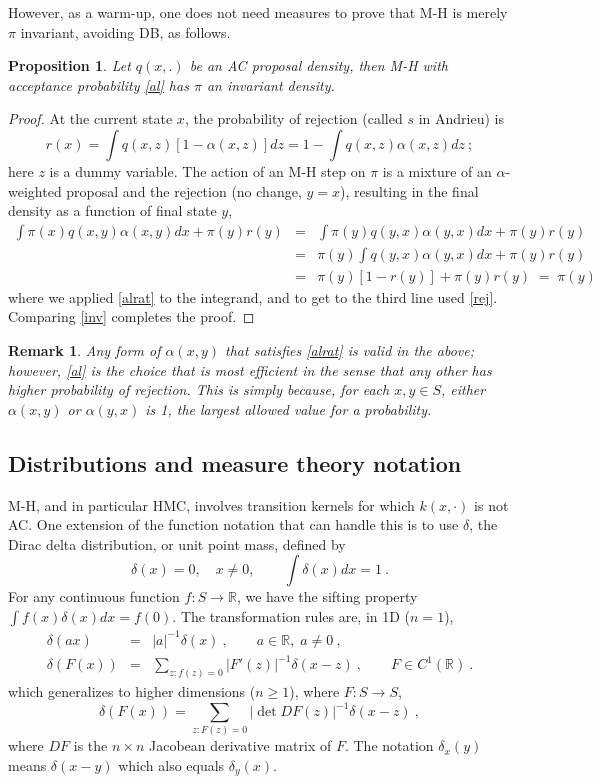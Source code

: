 \documentclass[10pt]{article}
\newcommand{\be}{\begin{equation}}
\newcommand{\ee}{\end{equation}}
\newcommand{\bea}{\begin{eqnarray}}
\newcommand{\eea}{\end{eqnarray}}
\newcommand{\R}{\mathbb{R}}
\newtheorem{pro}[thm]{Proposition}
\newtheorem{rmk}[thm]{Remark}
\newcommand{\al}{\alpha}
\begin{document}
However, as a warm-up, one does not need measures to prove that M-H is merely
$\pi$ invariant, avoiding DB, as follows.
\begin{pro}
  Let $q(x,.)$ be an AC proposal density, then M-H with acceptance probability
  \eqref{al} has $\pi$ an invariant density.
  \label{p:mhinv}
\end{pro}
\begin{proof}
  At the current state $x$, the probability of rejection
  (called $s$ in Andrieu) is
  \be
  r(x) = \int q(x,z) [1-\al(x,z)] dz  = 1 - \int q(x,z) \al(x,z) dz~;
  \label{rej}
  \ee
  here $z$ is a dummy variable.
  The action of an M-H step on $\pi$ is a mixture of an $\al$-weighted proposal
  and the rejection (no change, $y=x$),
  resulting in the final density as a function of final state $y$,
  \bea
  \int \pi(x) q(x,y)\al(x,y) dx + \pi(y) r(y)
  &=& \int \pi(y) q(y,x)\al(y,x) dx + \pi(y) r(y)
  \nonumber \\
  &=& \pi(y) \int q(y,x)\al(y,x) dx + \pi(y) r(y)
  \nonumber \\
  &=& \pi(y) [1-r(y)] + \pi(y) r(y) \; = \; \pi(y)
  \nonumber
\eea
where we applied \eqref{alrat} to the integrand,
and to get to the third line used \eqref{rej}.
Comparing \eqref{inv} completes the proof.
\end{proof}

\begin{rmk}
Any form of $\al(x,y)$ that satisfies \eqref{alrat} is valid
in the above; however, \eqref{al} is the choice that is most efficient
in the sense that any other has higher probability of rejection.
This is simply because, for each $x,y\in S$,
either $\al(x,y)$ or $\al(y,x)$ is 1, the largest
allowed value for a probability.
\end{rmk}


\subsection{Distributions and measure theory notation}

M-H, and in particular HMC,
involves transition kernels for which $k(x,\cdot)$
is not AC.
One extension of the function notation that can handle
this is to use $\delta$, the Dirac delta distribution, or unit point mass, defined by
$$
\delta(x) = 0, \quad x\neq 0, \qquad \int \delta(x) dx = 1~.
$$
For any continuous function $f:S \to \R$, we have the sifting property
$\int f(x) \delta(x) dx = f(0)$.
The transformation rules are, in 1D ($n=1$),
\bea
\delta(ax) &=& |a|^{-1} \delta(x)~, \qquad a \in \R, \; a\neq 0~,
\\
\delta(F(x)) &=& \sum_{z: f(z) = 0} |F'(z)|^{-1} \delta(x-z)~,
\qquad F\in C^1(\R)~.
\eea
which generalizes to higher dimensions ($n\ge 1$), where $F:S\to S$,
\be
\delta(F(x)) = \sum_{z: F(z) = 0} |\det DF(z)|^{-1} \delta(x-z)~,
\ee
where $DF$ is the $n\times n$ Jacobean derivative matrix of $F$.
The notation $\delta_x(y)$ means $\delta(x-y)$ which also equals $\delta_y(x)$.
\end{document}
